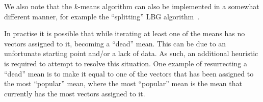 We also note that the $k$-means algorithm can also be implemented in a somewhat different manner, 
for example the ``splitting'' LBG algorithm~\cite{Linde80}.

In practise it is possible that while iterating at least one of the means has no vectors assigned to it,
becoming a ``dead'' mean.
This can be due to an unfortunate starting point and/or a lack of data.
As such, an additional heuristic is required to attempt to resolve this situation.
One example of resurrecting a ``dead'' mean is to make it equal to one of the vectors
that has been assigned to the most ``popular'' mean,
where the most ``popular'' mean is the mean that currently has the most vectors assigned to it.

